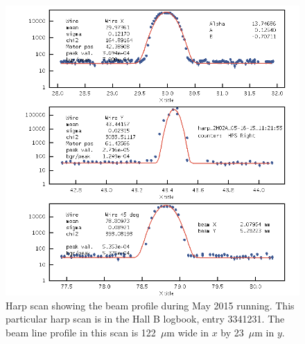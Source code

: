 
\begin{figure}[hbt]
\begin{minipage}{0.65\textwidth}
\includegraphics[width=\textwidth]{pics/experiment/harpScan.png}
\end{minipage}\hfill\begin{minipage}{0.32\textwidth}
\caption[Beam profile from harp scan during 2015 run]{ \label{fig:harpScan} \baselineskip 11pt
Harp scan showing the beam profile during May 2015 running. This particular harp scan is in the Hall B logbook, entry 3341231. The beam line profile in this scan is 122~$\mu$m wide in $x$ by 23~$\mu$m in $y$.}
\end{minipage}
\end{figure}


